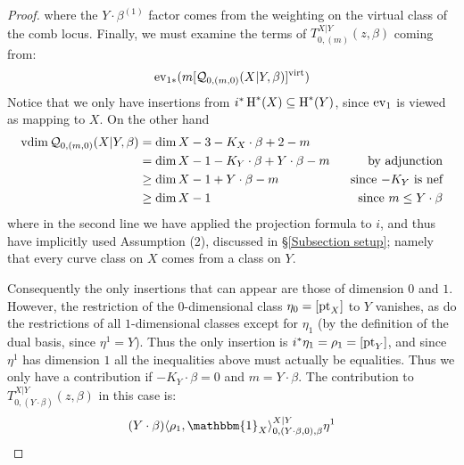 \begin{proof}
where the $Y \cdot \beta^{(1)}$ factor comes from the weighting on the virtual class of the comb locus. Finally, we must examine the terms of $T_{0,(m)}^{X|Y}(z,\beta)$ coming from:
\begin{equation*}\operatorname{ev}_{1*}(m[\mathcal{Q}_{0,(m,0)}(X|Y,\beta)]^{\operatorname{virt}})\end{equation*} 
Notice that we only have insertions from $i^*\operatorname{H}^*(X) \subseteq \operatorname{H}^*(Y)$, since $\operatorname{ev}_1$ is viewed as mapping to $X$. On the other hand
\begin{align*} \operatorname{vdim} \mathcal{Q}_{0,(m,0)}(X|Y,\beta) & = \dim X-3 -K_X \cdot \beta +2-m & \\
& = \dim X - 1 -K_Y \cdot \beta + Y \cdot \beta - m \ \ & \text{by adjunction} \\
& \geq \dim X - 1 + Y\cdot\beta - m \ \ & \text{since $-K_Y$ is nef} \\
& \geq \dim X - 1 \ \ & \text{since $m \leq Y \cdot \beta$} \end{align*}
where in the second line we have applied the projection formula to $i$, and thus have implicitly used Assumption (2), discussed in \S \ref{Subsection setup}; namely that every curve class on $X$ comes from a class on $Y$.

Consequently the only insertions that can appear are those of dimension $0$ and $1$. However, the restriction of the $0$-dimensional class $\eta_0 = [\operatorname{pt}_X]$ to $Y$ vanishes, as do the restrictions of all $1$-dimensional classes except for $\eta_1$ (by the definition of the dual basis, since $\eta^1 = Y$). Thus the only insertion is $i^*\eta_1=\rho_1=[\operatorname{pt}_Y]$, and since $\eta^1$ has dimension $1$ all the inequalities above must actually be equalities. Thus we only have a contribution if $-K_Y \cdot \beta = 0$ and $m = Y \cdot \beta$. The contribution to $T_{0,(Y\cdot\beta)}^{X|Y}(z,\beta)$ in this case is:
\begin{equation*} (Y \cdot \beta) \langle \rho_1 , \mathbbm{1}_X \rangle_{0,(Y \cdot \beta,0),\beta}^{X|Y} \eta^1 \end{equation*}


\end{proof}
